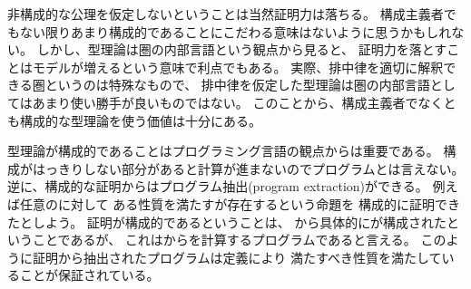 \documentclass[index]{subfiles}
\begin{document}
非構成的な公理を仮定しないということは当然証明力は落ちる。
構成主義者でもない限りあまり構成的であることにこだわる意味はないように思うかもしれない。
しかし、型理論は圏の内部言語という観点から見ると、
証明力を落とすことはモデルが増えるという意味で利点でもある。
実際、排中律を適切に解釈できる圏というのは特殊なもので、
排中律を仮定した型理論は圏の内部言語としてはあまり使い勝手が良いものではない。
このことから、構成主義者でなくとも構成的な型理論を使う価値は十分にある。

型理論が構成的であることはプログラミング言語の観点からは重要である。
構成がはっきりしない部分があると計算が進まないのでプログラムとは言えない。
逆に、構成的な証明からはプログラム抽出(program extraction)ができる。
例えば任意のに対して
ある性質を満たすが存在するという命題を
構成的に証明できたとしよう。
証明が構成的であるということは、
から具体的にが構成されたということであるが、
これはからを計算するプログラムであると言える。
このように証明から抽出されたプログラムは定義により
満たすべき性質を満たしていることが保証されている。
\end{document}
